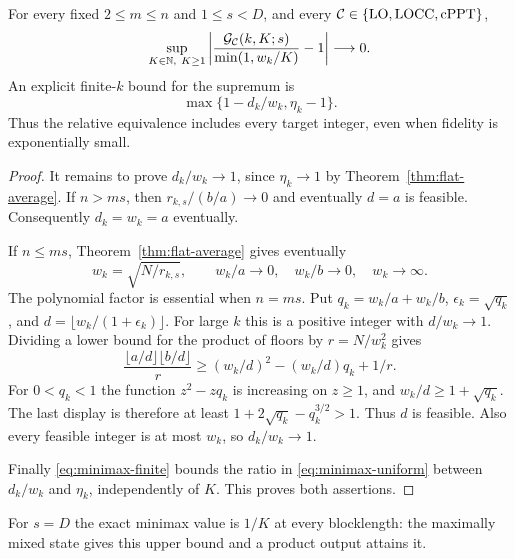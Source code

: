 \begin{theorem}\label{thm:minimax}
For every fixed $2\le m\le n$ and $1\le s<D$, and every $\mathcal C\in\{\mathrm{LO},\mathrm{LOCC},\mathrm{cPPT}\}$,
\begin{equation}\label{eq:minimax-uniform}
 \sup_{K\in\mathbb N,\ K\ge1}
 \left|\frac{\mathcal G_{\mathcal C}(k,K;s)}{\min(1,w_k/K)}-1\right|\longrightarrow0.
\end{equation}
An explicit finite-$k$ bound for the supremum is
\begin{equation}\label{eq:minimax-relative-bound}
 \max\{1-d_k/w_k,\eta_k-1\}.
\end{equation}
Thus the relative equivalence includes every target integer, even when fidelity is exponentially small.
\end{theorem}
\begin{proof}
It remains to prove $d_k/w_k\to1$, since $\eta_k\to1$ by Theorem~\ref{thm:flat-average}. If $n>ms$, then
$r_{k,s}/(b/a)\to0$ and eventually $d=a$ is feasible. Consequently $d_k=w_k=a$ eventually.

If $n\le ms$, Theorem~\ref{thm:flat-average} gives eventually
\[
 w_k=\sqrt{N/r_{k,s}},\qquad
 w_k/a\to0,\quad w_k/b\to0,\quad w_k\to\infty.
\]
The polynomial factor is essential when $n=ms$. Put $q_k=w_k/a+w_k/b$, $\epsilon_k=\sqrt{q_k}$, and $d=\lfloor w_k/(1+\epsilon_k)\rfloor$. For large $k$ this is a positive integer with $d/w_k\to1$. Dividing a lower bound for the product of floors by $r=N/w_k^2$ gives
\[
 \frac{\lfloor a/d\rfloor\lfloor b/d\rfloor}{r}
 \ge (w_k/d)^2-(w_k/d)q_k+1/r.
\]
For $0<q_k<1$ the function $z^2-zq_k$ is increasing on $z\ge1$, and $w_k/d\ge1+\sqrt{q_k}$. The last display is therefore at least
$1+2\sqrt{q_k}-q_k^{3/2}>1$. Thus $d$ is feasible. Also every feasible integer is at most $w_k$, so $d_k/w_k\to1$.

Finally \eqref{eq:minimax-finite} bounds the ratio in \eqref{eq:minimax-uniform} between $d_k/w_k$ and $\eta_k$, independently of $K$. This proves both assertions.
\end{proof}

For $s=D$ the exact minimax value is $1/K$ at every blocklength: the maximally mixed state gives this upper bound and a product output attains it.

